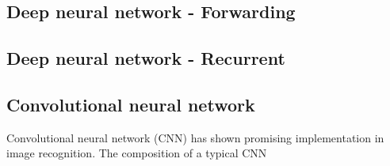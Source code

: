 \subsection{Deep neural network - Forwarding}
\subsection{Deep neural network - Recurrent}
\subsection{Convolutional neural network}
Convolutional neural network (CNN) has shown promising implementation in image recognition. The composition of a typical CNN